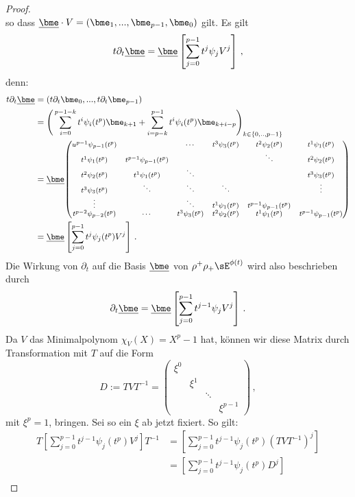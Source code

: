 \begin{proof}
\[\]
so dass $\underline{\bme}\cdot V=(\bme_1,...,\bme_{p-1},\bme_0)$ gilt.
Es gilt
\[
t\partial_t\underline{\bme}=\underline{\bme}\left[\sum_{j=0}^{p-1}t^j\psi_jV^j\right] \,,
\]
denn:
\begin{align*}
  t\partial_t\underline{\bme} &= (t\partial_t\bme_0,...,t\partial_t\bme_{p-1})\\
  &= \Bigg(\sum_{i=0}^{p-1-k}t^i\psi_i(t^p)\bme_{k+1} +
    \sum_{i=p-k}^{p-1}t^i\psi_i(t^p)\bme_{k+i-p}\Bigg)_{k\in\{0,..,p-1\}}\\
  &= \underline{\bme}
{ %
  \footnotesize
  \begin{pmatrix}u^{p-1}\psi_{p-1}(t^p) && \cdots & t^{3}\psi_{3}(t^p) & t^{2}
  \psi_{2}(t^p) & t^{1}\psi_{1}(t^p)\\
  t^{1}\psi_{1}(t^p) & t^{p-1}\psi_{p-1}(t^p) &  &
  & \ddots & t^{2}\psi_{2}(t^p)\\
  t^{2}\psi_{2}(t^p) & t^{1}\psi_{1}(t^p) & \ddots &  &  & t^{3}\psi_{3}(t^p)\\
  t^{3}\psi_{3}(t^p) & \ddots & \ddots & \ddots &  & \vdots\\
  \vdots &  & \ddots & t^{1}\psi_{1}(t^p) & t^{p-1}\psi_{p-1}(t^p)\\
  t^{p-2}\psi_{p-2}(t^p) & \cdots & t^{3}\psi_{3}(t^p) & t^{2}\psi_{2}(t^p) &
  t^{1}\psi_{1}(t^p) & t^{p-1}\psi_{p-1}(t^p)
  \end{pmatrix}
} \\
  &= \underline{\bme}\left[\sum_{j=0}^{p-1}t^j\psi_j(t^p)V^j\right] \,.
\end{align*}
Die Wirkung von $\partial_t$ auf die Basis $\underline{\bme}$ von
$\rho^+\rho_+\sE^{\phi(t)}$ wird also beschrieben durch
\[
\partial_t\underline{\bme}=\underline{\bme}\left[\sum_{j=0}^{p-1}t^{j-1}\psi_jV^j\right]\,.
\]
Da $V$ das Minimalpolynom $\chi_V(X)=X^p-1$ hat, können wir diese Matrix durch
Transformation mit $T$ auf die Form
\[
D:=TVT^{-1}=\begin{pmatrix}\xi^{0}\\
 & \xi^{1}\\
 &  & \ddots\\
 &  &  & \xi^{p-1}
\end{pmatrix} \,,
\]
mit $\xi^p=1$, bringen. Sei so ein $\xi$ ab jetzt fixiert. %
So gilt:
\begin{align*}
  T\left[\sum_{j=0}^{p-1}t^{j-1}\psi_j(t^p)V^j\right]T^{-1} 
  &= \left[\sum_{j=0}^{p-1}t^{j-1}\psi_j(t^p) (TVT^{-1})^j\right]\\
  &= \left[\sum_{j=0}^{p-1}t^{j-1}\psi_j(t^p)D^j\right]\\

\end{align*}
\end{proof}
